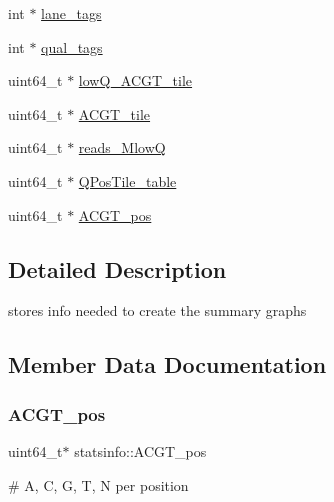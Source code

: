 \begin{DoxyCompactItemize}
\item 
int $\ast$ \mbox{\hyperlink{structstatsinfo_a2fc74c1d7cec79d9b28b5e578d96d7a1}{lane\+\_\+tags}}
\item 
int $\ast$ \mbox{\hyperlink{structstatsinfo_a2fc7cfbe32bd01653402ff070638292b}{qual\+\_\+tags}}
\item 
uint64\+\_\+t $\ast$ \mbox{\hyperlink{structstatsinfo_ac1a8b88e2e4f486f2767072588adcd2a}{low\+Q\+\_\+\+A\+C\+G\+T\+\_\+tile}}
\item 
uint64\+\_\+t $\ast$ \mbox{\hyperlink{structstatsinfo_aa4987d17317a2d744efaa104f7a3e0b7}{A\+C\+G\+T\+\_\+tile}}
\item 
uint64\+\_\+t $\ast$ \mbox{\hyperlink{structstatsinfo_a9b58ee91e10fa9301a186ca94e68e6fb}{reads\+\_\+\+MlowQ}}
\item 
uint64\+\_\+t $\ast$ \mbox{\hyperlink{structstatsinfo_af2781fc5113bab8c208921a221e2c834}{Q\+Pos\+Tile\+\_\+table}}
\item 
uint64\+\_\+t $\ast$ \mbox{\hyperlink{structstatsinfo_a315b402bd89ea205117d2fab4b26ef10}{A\+C\+G\+T\+\_\+pos}}
\end{DoxyCompactItemize}


\subsection{Detailed Description}
stores info needed to create the summary graphs 

\subsection{Member Data Documentation}
\mbox{\label{structstatsinfo_a315b402bd89ea205117d2fab4b26ef10}} 
\subsubsection{\texorpdfstring{A\+C\+G\+T\+\_\+pos}{ACGT\_pos}}
{\footnotesize\ttfamily uint64\+\_\+t$\ast$ statsinfo\+::\+A\+C\+G\+T\+\_\+pos}

\# A, C, G, T, N per position \mbox{\label{structstatsinfo_aa4987d17317a2d744efaa104f7a3e0b7}} 
